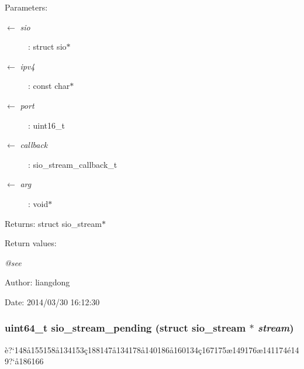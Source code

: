 \begin{Desc}
\item[Parameters:]
\begin{description}
\item[\mbox{$\leftarrow$} {\em sio}]: struct sio$\ast$ \item[\mbox{$\leftarrow$} {\em ipv4}]: const char$\ast$ \item[\mbox{$\leftarrow$} {\em port}]: uint16\_\-t \item[\mbox{$\leftarrow$} {\em callback}]: sio\_\-stream\_\-callback\_\-t \item[\mbox{$\leftarrow$} {\em arg}]: void$\ast$ \end{description}
\end{Desc}
\begin{Desc}
\item[Returns:]struct sio\_\-stream$\ast$ \end{Desc}
\begin{Desc}
\item[Return values:]
\begin{description}
\item[{\em @see}]\end{description}
\end{Desc}
\begin{Desc}
\item[Author:]liangdong \end{Desc}
\begin{Desc}
\item[Date:]2014/03/30 16:12:30 \end{Desc}
\subsubsection{\setlength{\rightskip}{0pt plus 5cm}uint64\_\-t sio\_\-stream\_\-pending (struct sio\_\-stream $\ast$ {\em stream})}\label{sio__stream_8c_a14}


\`{e}?`148\aa{}155158\aa{}134153\c{c}188147\aa{}134178\aa{}140186\aa{}160134\c{c}167175\ae{}149176\ae{}141174\'{e}149?`\aa{}186166 

